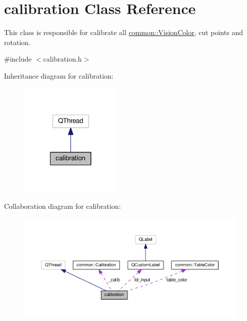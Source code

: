 \hypertarget{classcalibration}{\section{calibration Class Reference}
\label{classcalibration}
}


This class is responsible for calibrate all \hyperlink{structcommon_1_1VisionColor}{common\-::\-Vision\-Color}, cut points and rotation.  




{\ttfamily \#include $<$calibration.\-h$>$}



Inheritance diagram for calibration\-:
\nopagebreak
\begin{figure}[H]
\begin{center}
\leavevmode
\includegraphics[width=140pt]{classcalibration__inherit__graph}
\end{center}
\end{figure}


Collaboration diagram for calibration\-:
\nopagebreak
\begin{figure}[H]
\begin{center}
\leavevmode
\includegraphics[width=350pt]{classcalibration__coll__graph}
\end{center}
\end{figure}
